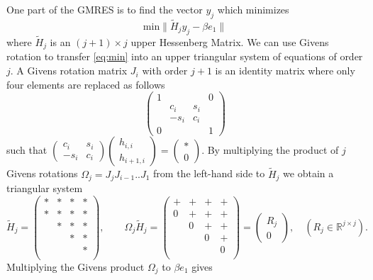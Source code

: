 \documentclass{article}
\newcommand{\norm}[1]{\lVert#1\rVert}
\begin{document}
One part of the GMRES is to find the vector $y_j$ which minimizes 
\begin{equation}
    \text{min} \norm{ \tilde{H}_j y_j - \beta e_1 }
    \label{eq:min}
\end{equation}
where $\tilde{H}_j$ is an $(j+1)\times j$ upper Hessenberg Matrix. We can use Givens rotation to transfer \eqref{eq:min} into an upper triangular system of equations of order $j$. A Givens rotation matrix $J_i$ with order $j+1$ is an identity matrix where only four elements are replaced as follows
\begin{equation*}
    \begin{pmatrix}
    1 &     &     & 0 \\
      & c_i & s_i &   \\
      &-s_i & c_i &   \\
    0 &     &     & 1
    \end{pmatrix}
\end{equation*}
such that $\begin{pmatrix}c_i & s_i   \\ -s_i & c_i \end{pmatrix}  \begin{pmatrix} h_{i,i} \\ h_{i+1, i} \end{pmatrix} = \begin{pmatrix} * \\ 0 \end{pmatrix}$. By multiplying the product of $j$ Givens rotations $\Omega_j = J_jJ_{i-1}..J_1$ from the left-hand side to $\tilde{H}_j$ we obtain a triangular system
\begin{equation*}
\tilde{H}_j = 
    \begin{pmatrix}
    * & * & * & * \\
    * & * & * & * \\
      & * & * & * \\
      &   & * & * \\
      &   &   & * \\
    \end{pmatrix},
    \qquad
 \Omega_j\tilde{H}_j = 
 \begin{pmatrix}
    + & + & + & + \\
    0 & + & + & + \\
      & 0 & + & + \\
      &   & 0 & + \\
      &   &   & 0 \\
    \end{pmatrix}
    =
    \begin{pmatrix}
        R_j \\
        0
    \end{pmatrix},
    \quad (R_j \in\mathbb{R}^{j\times j}).
\end{equation*}
Multiplying the Givens product $\Omega_j$ to $\beta e_1$ gives
\end{document}
